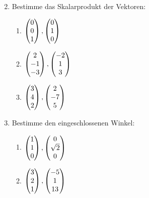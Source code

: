 \begin{enumerate}
\begin{multicols}{3}
\begin{enumerate}
				\end{enumerate}
			\end{multicols}
			\pagebreak
			\item Bestimme das Skalarprodukt der Vektoren:
			\begin{multicols}{3}
				\begin{enumerate}
				    \item $\mvect{0\\0\\1},\mvect{0\\1\\0}$
				    \item $\mvect{2\\-1\\-3}, \mvect{-2\\1\\3}$
				    \item $\mvect{3\\4\\2},\mvect{2\\-7\\5}$
			    \end{enumerate}
			\end{multicols}
			\item Bestimme den eingeschlossenen Winkel:
			\begin{multicols}{2}
				\begin{enumerate}
			    	\item $\mvect{1\\1\\0},\mvect{0\\\sqrt{2}\\0}$
			    	\item $\mvect{3\\2\\1},\mvect{-5\\1\\13}$
			    \end{enumerate}
			\end{multicols}
       

\end{enumerate}
